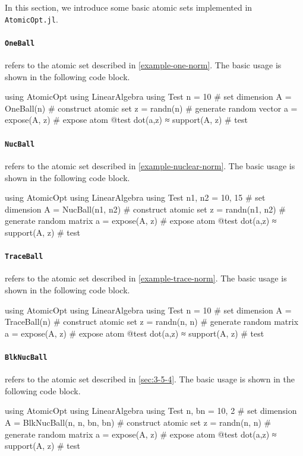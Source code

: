 In this section, we introduce some basic atomic sets implemented in \texttt{AtomicOpt.jl}. 

\paragraph{\texttt{OneBall}} refers to the atomic set described in \autoref{example-one-norm}. The basic usage is shown in the following code block. 
\begin{code}
  using AtomicOpt
  using LinearAlgebra
  using Test
  n = 10                          # set dimension
  A = OneBall(n)                  # construct atomic set 
  z = randn(n)                    # generate random vector
  a = expose(A, z)                # expose atom
  @test dot(a,z) ≈ support(A, z)  # test
\end{code}

\paragraph{\texttt{NucBall}} refers to the atomic set described in \autoref{example-nuclear-norm}. The basic usage is shown in the following code block. 
\begin{code}
  using AtomicOpt
  using LinearAlgebra
  using Test
  n1, n2 = 10, 15                 # set dimension 
  A = NucBall(n1, n2)             # construct atomic set 
  z = randn(n1, n2)               # generate random matrix
  a = expose(A, z)                # expose atom
  @test dot(a,z) ≈ support(A, z)  # test
\end{code}

\paragraph{\texttt{TraceBall}} refers to the atomic set described in \autoref{example-trace-norm}. The basic usage is shown in the following code block. 
\begin{code}
  using AtomicOpt
  using LinearAlgebra
  using Test
  n = 10                          # set dimension
  A = TraceBall(n)                # construct atomic set 
  z = randn(n, n)                 # generate random matrix
  a = expose(A, z)                # expose atom
  @test dot(a,z) ≈ support(A, z)  # test
\end{code}

\paragraph{\texttt{BlkNucBall}} refers to the atomic set described in \autoref{sec:3-5-4}. The basic usage is shown in the following code block. 
\begin{code}
  using AtomicOpt
  using LinearAlgebra
  using Test
  n, bn = 10, 2                   # set dimension
  A = BlkNucBall(n, n, bn, bn)    # construct atomic set 
  z = randn(n, n)                 # generate random matrix
  a = expose(A, z)                # expose atom
  @test dot(a,z) ≈ support(A, z)  # test
\end{code}


